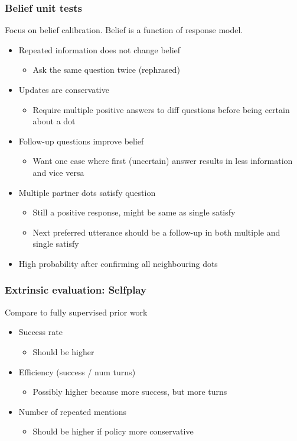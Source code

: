 \documentclass{beamer}
\begin{document}
\begin{frame}
\frametitle{Belief unit tests}
Focus on belief calibration. Belief is a function of response model.
\begin{itemize}
\item Repeated information does not change belief
    \begin{itemize}
    \item Ask the same question twice (rephrased)
    \end{itemize}
\item Updates are conservative
    \begin{itemize}
    \item Require multiple positive answers
        to diff questions before being certain about a dot
    \end{itemize}
\item Follow-up questions improve belief
    \begin{itemize}
    \item Want one case where first (uncertain) answer results in less information
        and vice versa
    \end{itemize}
\item Multiple partner dots satisfy question
    \begin{itemize}
    \item Still a positive response, might be same as single satisfy
    \item Next preferred utterance should be a follow-up in both multiple and
        single satisfy
    \end{itemize}
\item High probability after confirming all neighbouring dots
\end{itemize}
\end{frame}

\begin{frame}
\frametitle{Extrinsic evaluation: Selfplay}
Compare to fully supervised prior work
\begin{itemize}
\item Success rate
    \begin{itemize}
    \item Should be higher
    \end{itemize}
\item Efficiency (success / num turns)
    \begin{itemize}
    \item Possibly higher because more success, but more turns
    \end{itemize}
\item Number of repeated mentions
    \begin{itemize}
    \item Should be higher if policy more conservative
    \end{itemize}
\end{itemize}
\end{frame}
\end{document}
